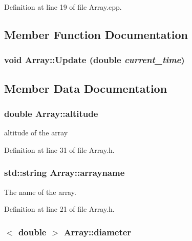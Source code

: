 Definition at line 19 of file Array.cpp.



\subsection{Member Function Documentation}
\hypertarget{classArray_a3fee2819664f2165c8e92e74bb7067fd}{
\subsubsection[{Update}]{\setlength{\rightskip}{0pt plus 5cm}void Array::Update (double {\em current\_\-time})}}
\label{classArray_a3fee2819664f2165c8e92e74bb7067fd}


\subsection{Member Data Documentation}
\hypertarget{classArray_a07662f84d93f59a30c9312b6b546ee39}{
\subsubsection[{altitude}]{\setlength{\rightskip}{0pt plus 5cm}double {\bf Array::altitude}}}
\label{classArray_a07662f84d93f59a30c9312b6b546ee39}


altitude of the array 



Definition at line 31 of file Array.h.

\hypertarget{classArray_a12eb22fefdce3d4ae71d0340717c293a}{
\subsubsection[{arrayname}]{\setlength{\rightskip}{0pt plus 5cm}std::string {\bf Array::arrayname}}}
\label{classArray_a12eb22fefdce3d4ae71d0340717c293a}


The name of the array. 



Definition at line 21 of file Array.h.

\hypertarget{classArray_a4aa89a5ce6246c1b79c2c5c9c7bdc398}{
\subsubsection[{diameter}]{$<$ double $>$ {\bf Array::diameter}}}
\label{classArray_a4aa89a5ce6246c1b79c2c5c9c7bdc398}


